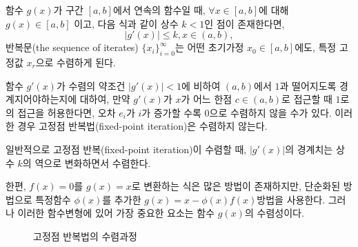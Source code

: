 \begin{theorem}\label{theo:6-2}
함수 $g(x)$가 구간 $[a,b]$에서 연속의 함수일 때, $\forall x \in [a,b]$에 대해 $g(x)\in [a,b]$ 이고, 다음 식과 같이 상수 $k<1$인 점이 존재한다면,
\begin{equation}\label{eq:theo-2}
\left|g'(x)\right|\leq k, x \in (a,b),
\end{equation}
반복문(the sequence of iterates) $\{x_{i}\}_{i=0}^{\infty}$는 어떤 초기가정 $x_{0} \in [a,b]$에도, 특정 고정값 $x_{r}$으로 수렴하게 된다.
\end{theorem}
함수 $g'(x)$가 수렴의 약조건 $\left|g'(x)\right|<1$에 비하여 $(a,b)$에서 $1$과 떨어지도록 경계지어야하는지에 대하여, 만약 $g'(x)$가 $x$가 어느 한점 $c \in (a,b)$로 접근할 때 $1$로의 접근을 허용한다면, 오차 $e_{i}$가 $i$가 증가할 수록 $0$으로 수렴하지 않을 수가 있다. 이러한 경우 고정점 반복법(fixed-point iteration)은 수렴하지 않는다.

일반적으로 고정점 반복(fixed-point iteration)이 수렴할 때, $\left|g'(x)\right|$의 경계치는 상수 $k$의 역으로 변화하면서 수렴한다.

한편, $f(x)=0$를 $g(x)=x$로 변환하는 식은 많은 방법이 존재하지만, 단순화된 방법으로 특정함수 $\phi(x)$를 추가한 $g(x)=x-\phi(x)f(x)$방법을 사용한다. 그러나 이러한 함수변형에 있어 가장 중요한 요소는 함수 $g(x)$의 수렴성이다.
\begin{figure}[!hbpt]
\centering
{}
\caption{고정점 반복법의 수렴과정}
\label{fig:6-1}
\end{figure}
\clearpage
